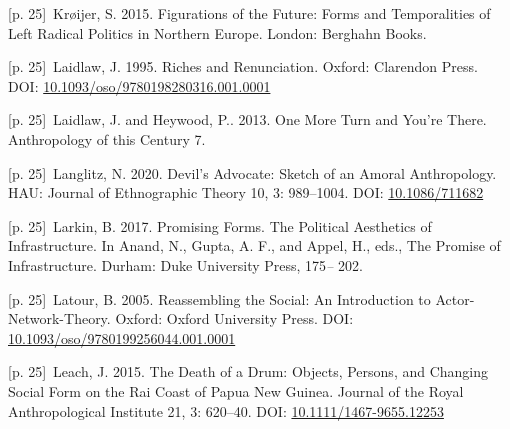 \documentclass[10pt,a4paper]{article}
\begin{document}
\noindent\begin{minipage}[t]{\linewidth}{\scriptsize\color{gray} [p. 25]}\ Krøijer, S. 2015. Figurations of the Future: Forms and Temporalities of Left Radical Politics in Northern Europe. London: Berghahn Books.\par\end{minipage}\par
\noindent\begin{minipage}[t]{\linewidth}{\scriptsize\color{gray} [p. 25]}\ Laidlaw, J. 1995. Riches and Renunciation. Oxford: Clarendon Press. DOI: \url{10.1093/oso/9780198280316.001.0001}\par\end{minipage}\par
\noindent\begin{minipage}[t]{\linewidth}{\scriptsize\color{gray} [p. 25]}\ Laidlaw, J. and Heywood, P.. 2013. One More Turn and You’re There. Anthropology of this Century 7.\par\end{minipage}\par
\noindent\begin{minipage}[t]{\linewidth}{\scriptsize\color{gray} [p. 25]}\ Langlitz, N. 2020. Devil’s Advocate: Sketch of an Amoral Anthropology. HAU: Journal of Ethnographic Theory 10, 3: 989–1004. DOI: \url{10.1086/711682}\par\end{minipage}\par
\noindent\begin{minipage}[t]{\linewidth}{\scriptsize\color{gray} [p. 25]}\ Larkin, B. 2017. Promising Forms. The Political Aesthetics of Infrastructure. In Anand, N., Gupta, A. F., and Appel, H., eds., The Promise of Infrastructure. Durham: Duke University Press, 175\textit{–} 202.\par\end{minipage}\par
\noindent\begin{minipage}[t]{\linewidth}{\scriptsize\color{gray} [p. 25]}\ Latour, B. 2005. Reassembling the Social: An Introduction to Actor-Network-Theory. Oxford: Oxford University Press. DOI: \url{10.1093/oso/9780199256044.001.0001}\par\end{minipage}\par
\noindent\begin{minipage}[t]{\linewidth}{\scriptsize\color{gray} [p. 25]}\ Leach, J. 2015. The Death of a Drum: Objects, Persons, and Changing Social Form on the Rai Coast of Papua New Guinea. Journal of the Royal Anthropological Institute 21, 3: 620–40. DOI: \url{10.1111/1467-9655.12253}\par\end{minipage}\par
\end{document}
